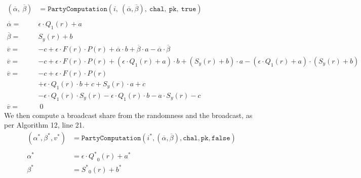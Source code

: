 \documentclass[11pt]{report}
\theoremstyle{definition}
\theoremstyle{plain}
\begin{document}
\begin{align*}
  (\overline{\alpha},\ \overline{\beta})         & =
  \texttt{PartyComputation}(i,\ (\overline{\alpha}, \overline{\beta}),\ \texttt{chal},\ \texttt{pk},\ \texttt{true})                                                                                   \\\\
  \overline{\alpha}                         =    & \epsilon \cdot Q_1(r) + a                                                                                                                           \\
  \overline{\beta}                          =    & S_y(r)  + b                                                                                                                                         \\
  \overline{v}                            =      & -c + \epsilon \cdot F(r) \cdot P(r) + \overline{\alpha} \cdot b + \overline{\beta} \cdot a  - \overline{\alpha} \cdot \overline{\beta}              \\
  \overline{v}                            =      & -c + \epsilon \cdot F(r) \cdot P(r) + (\epsilon \cdot Q_1(r) + a) \cdot b + (S_y(r)  + b) \cdot a  - (\epsilon \cdot Q_1(r) + a) \cdot (S_y(r) + b) \\
  \overline{v}                            =      & -c + \epsilon \cdot F(r) \cdot P(r)                                                                                                                 \\
                                                 & + \epsilon \cdot Q_1(r) \cdot b + c + S_y(r) \cdot a + c                                                                                            \\
                                                 & - \epsilon \cdot Q_1(r) \cdot S_y(r) - \epsilon \cdot Q_1(r) \cdot b - a \cdot S_y(r) - c                                                           \\
  \overline{v}                                 = & \ 0
\end{align*}
We then compute a broadcast share from the randomness and the broadcast, as per Algorithm 12, line 21.
\begin{align*}
  (\alpha^*, \beta^*, v^*) & = \texttt{PartyComputation}(i^*, (\overline{\alpha},
  \overline{\beta}), \texttt{chal}, \texttt{pk}, \texttt{false})                  \\\\
  \alpha^*                 & = \epsilon \cdot {Q^*}_0(r) + a^*                    \\
  \beta^*                  & =  {S^*}_0(r) + b^*
\end{align*}
\end{document}
